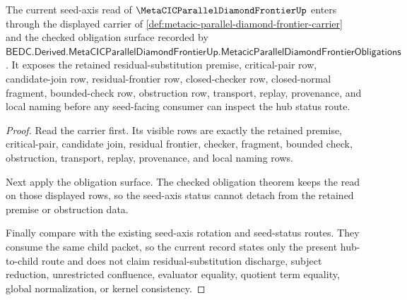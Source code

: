 \begin{theorem}
\label{thm:metacic-parallel-diamond-frontier-seed-axis-current-record}
The current seed-axis read of $\MetaCICParallelDiamondFrontierUp$ enters through the displayed carrier of \autoref{def:metacic-parallel-diamond-frontier-carrier} and the checked obligation surface recorded by $\mathsf{BEDC.Derived.MetaCICParallelDiamondFrontierUp.MetacicParallelDiamondFrontierObligations}$. It exposes the retained residual-substitution premise, critical-pair row, candidate-join row, residual-frontier row, closed-checker row, closed-normal fragment, bounded-check row, obstruction row, transport, replay, provenance, and local naming before any seed-facing consumer can inspect the hub status route.
\end{theorem}
\begin{proof}
Read the carrier first. Its visible rows are exactly the retained premise, critical-pair, candidate join, residual frontier, checker, fragment, bounded check, obstruction, transport, replay, provenance, and local naming rows.

Next apply the obligation surface. The checked obligation theorem keeps the read on those displayed rows, so the seed-axis status cannot detach from the retained premise or obstruction data.

Finally compare with the existing seed-axis rotation and seed-status routes. They consume the same child packet, so the current record states only the present hub-to-child route and does not claim residual-substitution discharge, subject reduction, unrestricted confluence, evaluator equality, quotient term equality, global normalization, or kernel consistency.
\end{proof}
